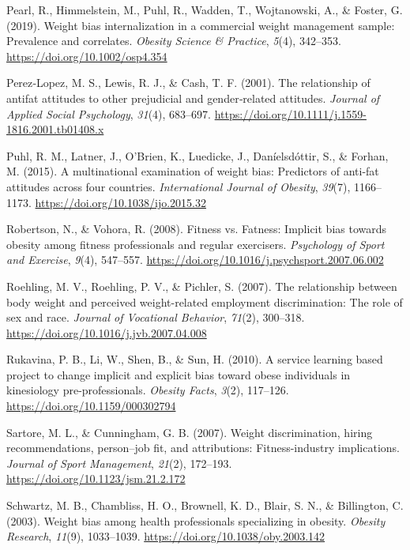 \documentclass[
  jou,
  longtable,
  nolmodern,
  notxfonts,
  notimes,
  colorlinks=true,linkcolor=blue,citecolor=blue,urlcolor=blue]{apa7}
\newlength{\cslhangindent}
\newenvironment{CSLReferences}[2] %
 {\begin{list}{}{%
  \setlength{\itemindent}{0pt}
  \setlength{\leftmargin}{0pt}
  \setlength{\parsep}{0pt}
  \ifodd #1
   \setlength{\leftmargin}{\cslhangindent}
   \setlength{\itemindent}{-1\cslhangindent}
  \fi
  \setlength{\itemsep}{#2\baselineskip}}}
 {\end{list}}
\begin{document}
\begin{CSLReferences}{1}{0}
Pearl, R., Himmelstein, M., Puhl, R., Wadden, T., Wojtanowski, A., \&
Foster, G. (2019). Weight bias internalization in a commercial weight
management sample: Prevalence and correlates. \emph{Obesity Science \&
Practice}, \emph{5}(4), 342--353. \url{https://doi.org/10.1002/osp4.354}

Perez‐Lopez, M. S., Lewis, R. J., \& Cash, T. F. (2001). The
relationship of antifat attitudes to other prejudicial and
gender‐related attitudes. \emph{Journal of Applied Social Psychology},
\emph{31}(4), 683--697.
\url{https://doi.org/10.1111/j.1559-1816.2001.tb01408.x}

Puhl, R. M., Latner, J., O'Brien, K., Luedicke, J., Daníelsdóttir, S.,
\& Forhan, M. (2015). A multinational examination of weight bias:
Predictors of anti-fat attitudes across four countries.
\emph{International Journal of Obesity}, \emph{39}(7), 1166--1173.
\url{https://doi.org/10.1038/ijo.2015.32}

Robertson, N., \& Vohora, R. (2008). Fitness vs. Fatness: Implicit bias
towards obesity among fitness professionals and regular exercisers.
\emph{Psychology of Sport and Exercise}, \emph{9}(4), 547--557.
\url{https://doi.org/10.1016/j.psychsport.2007.06.002}

Roehling, M. V., Roehling, P. V., \& Pichler, S. (2007). The
relationship between body weight and perceived weight-related employment
discrimination: The role of sex and race. \emph{Journal of Vocational
Behavior}, \emph{71}(2), 300--318.
\url{https://doi.org/10.1016/j.jvb.2007.04.008}

Rukavina, P. B., Li, W., Shen, B., \& Sun, H. (2010). A service learning
based project to change implicit and explicit bias toward obese
individuals in kinesiology pre-professionals. \emph{Obesity Facts},
\emph{3}(2), 117--126. \url{https://doi.org/10.1159/000302794}

Sartore, M. L., \& Cunningham, G. B. (2007). Weight discrimination,
hiring recommendations, person--job fit, and attributions:
Fitness-industry implications. \emph{Journal of Sport Management},
\emph{21}(2), 172--193. \url{https://doi.org/10.1123/jsm.21.2.172}

Schwartz, M. B., Chambliss, H. O., Brownell, K. D., Blair, S. N., \&
Billington, C. (2003). Weight bias among health professionals
specializing in obesity. \emph{Obesity Research}, \emph{11}(9),
1033--1039. \url{https://doi.org/10.1038/oby.2003.142}


\end{CSLReferences}
\end{document}
